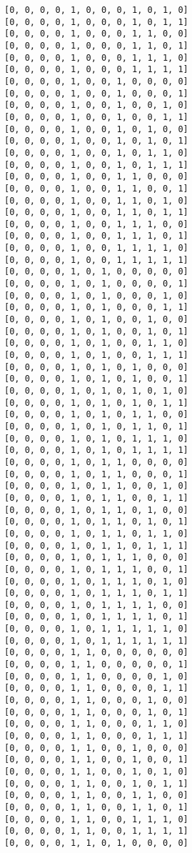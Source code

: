 \documentclass[11pt]{article}
\begin{document}
\begin{Verbatim}[commandchars=\\\{\}]
[0, 0, 0, 0, 1, 0, 0, 0, 1, 0, 1, 0]
[0, 0, 0, 0, 1, 0, 0, 0, 1, 0, 1, 1]
[0, 0, 0, 0, 1, 0, 0, 0, 1, 1, 0, 0]
[0, 0, 0, 0, 1, 0, 0, 0, 1, 1, 0, 1]
[0, 0, 0, 0, 1, 0, 0, 0, 1, 1, 1, 0]
[0, 0, 0, 0, 1, 0, 0, 0, 1, 1, 1, 1]
[0, 0, 0, 0, 1, 0, 0, 1, 0, 0, 0, 0]
[0, 0, 0, 0, 1, 0, 0, 1, 0, 0, 0, 1]
[0, 0, 0, 0, 1, 0, 0, 1, 0, 0, 1, 0]
[0, 0, 0, 0, 1, 0, 0, 1, 0, 0, 1, 1]
[0, 0, 0, 0, 1, 0, 0, 1, 0, 1, 0, 0]
[0, 0, 0, 0, 1, 0, 0, 1, 0, 1, 0, 1]
[0, 0, 0, 0, 1, 0, 0, 1, 0, 1, 1, 0]
[0, 0, 0, 0, 1, 0, 0, 1, 0, 1, 1, 1]
[0, 0, 0, 0, 1, 0, 0, 1, 1, 0, 0, 0]
[0, 0, 0, 0, 1, 0, 0, 1, 1, 0, 0, 1]
[0, 0, 0, 0, 1, 0, 0, 1, 1, 0, 1, 0]
[0, 0, 0, 0, 1, 0, 0, 1, 1, 0, 1, 1]
[0, 0, 0, 0, 1, 0, 0, 1, 1, 1, 0, 0]
[0, 0, 0, 0, 1, 0, 0, 1, 1, 1, 0, 1]
[0, 0, 0, 0, 1, 0, 0, 1, 1, 1, 1, 0]
[0, 0, 0, 0, 1, 0, 0, 1, 1, 1, 1, 1]
[0, 0, 0, 0, 1, 0, 1, 0, 0, 0, 0, 0]
[0, 0, 0, 0, 1, 0, 1, 0, 0, 0, 0, 1]
[0, 0, 0, 0, 1, 0, 1, 0, 0, 0, 1, 0]
[0, 0, 0, 0, 1, 0, 1, 0, 0, 0, 1, 1]
[0, 0, 0, 0, 1, 0, 1, 0, 0, 1, 0, 0]
[0, 0, 0, 0, 1, 0, 1, 0, 0, 1, 0, 1]
[0, 0, 0, 0, 1, 0, 1, 0, 0, 1, 1, 0]
[0, 0, 0, 0, 1, 0, 1, 0, 0, 1, 1, 1]
[0, 0, 0, 0, 1, 0, 1, 0, 1, 0, 0, 0]
[0, 0, 0, 0, 1, 0, 1, 0, 1, 0, 0, 1]
[0, 0, 0, 0, 1, 0, 1, 0, 1, 0, 1, 0]
[0, 0, 0, 0, 1, 0, 1, 0, 1, 0, 1, 1]
[0, 0, 0, 0, 1, 0, 1, 0, 1, 1, 0, 0]
[0, 0, 0, 0, 1, 0, 1, 0, 1, 1, 0, 1]
[0, 0, 0, 0, 1, 0, 1, 0, 1, 1, 1, 0]
[0, 0, 0, 0, 1, 0, 1, 0, 1, 1, 1, 1]
[0, 0, 0, 0, 1, 0, 1, 1, 0, 0, 0, 0]
[0, 0, 0, 0, 1, 0, 1, 1, 0, 0, 0, 1]
[0, 0, 0, 0, 1, 0, 1, 1, 0, 0, 1, 0]
[0, 0, 0, 0, 1, 0, 1, 1, 0, 0, 1, 1]
[0, 0, 0, 0, 1, 0, 1, 1, 0, 1, 0, 0]
[0, 0, 0, 0, 1, 0, 1, 1, 0, 1, 0, 1]
[0, 0, 0, 0, 1, 0, 1, 1, 0, 1, 1, 0]
[0, 0, 0, 0, 1, 0, 1, 1, 0, 1, 1, 1]
[0, 0, 0, 0, 1, 0, 1, 1, 1, 0, 0, 0]
[0, 0, 0, 0, 1, 0, 1, 1, 1, 0, 0, 1]
[0, 0, 0, 0, 1, 0, 1, 1, 1, 0, 1, 0]
[0, 0, 0, 0, 1, 0, 1, 1, 1, 0, 1, 1]
[0, 0, 0, 0, 1, 0, 1, 1, 1, 1, 0, 0]
[0, 0, 0, 0, 1, 0, 1, 1, 1, 1, 0, 1]
[0, 0, 0, 0, 1, 0, 1, 1, 1, 1, 1, 0]
[0, 0, 0, 0, 1, 0, 1, 1, 1, 1, 1, 1]
[0, 0, 0, 0, 1, 1, 0, 0, 0, 0, 0, 0]
[0, 0, 0, 0, 1, 1, 0, 0, 0, 0, 0, 1]
[0, 0, 0, 0, 1, 1, 0, 0, 0, 0, 1, 0]
[0, 0, 0, 0, 1, 1, 0, 0, 0, 0, 1, 1]
[0, 0, 0, 0, 1, 1, 0, 0, 0, 1, 0, 0]
[0, 0, 0, 0, 1, 1, 0, 0, 0, 1, 0, 1]
[0, 0, 0, 0, 1, 1, 0, 0, 0, 1, 1, 0]
[0, 0, 0, 0, 1, 1, 0, 0, 0, 1, 1, 1]
[0, 0, 0, 0, 1, 1, 0, 0, 1, 0, 0, 0]
[0, 0, 0, 0, 1, 1, 0, 0, 1, 0, 0, 1]
[0, 0, 0, 0, 1, 1, 0, 0, 1, 0, 1, 0]
[0, 0, 0, 0, 1, 1, 0, 0, 1, 0, 1, 1]
[0, 0, 0, 0, 1, 1, 0, 0, 1, 1, 0, 0]
[0, 0, 0, 0, 1, 1, 0, 0, 1, 1, 0, 1]
[0, 0, 0, 0, 1, 1, 0, 0, 1, 1, 1, 0]
[0, 0, 0, 0, 1, 1, 0, 0, 1, 1, 1, 1]
[0, 0, 0, 0, 1, 1, 0, 1, 0, 0, 0, 0]

\end{Verbatim}
\end{document}
